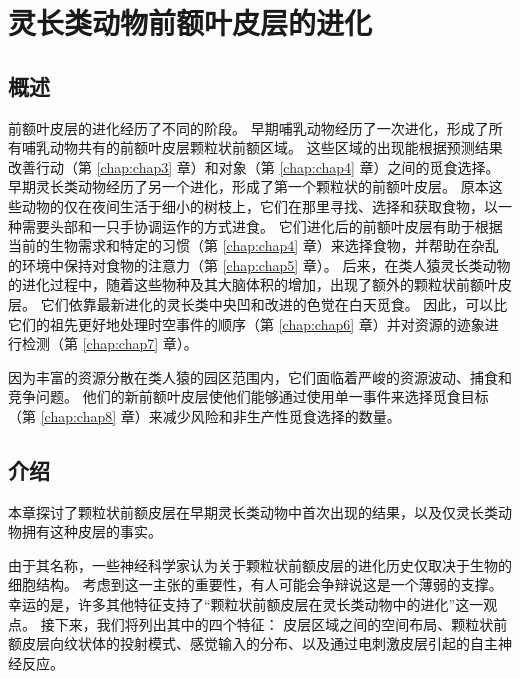 \chapter{灵长类动物前额叶皮层的进化} \label{chap:chap2}

\section{概述}
前额叶皮层的进化经历了不同的阶段。
早期哺乳动物经历了一次进化，形成了所有哺乳动物共有的前额叶皮层颗粒状前额区域。
这些区域的出现能根据预测结果改善行动（第 \ref{chap:chap3} 章）和对象（第 \ref{chap:chap4} 章）之间的觅食选择。
早期灵长类动物经历了另一个进化，形成了第一个颗粒状的前额叶皮层。
原本这些动物的仅在夜间生活于细小的树枝上，它们在那里寻找、选择和获取食物，以一种需要头部和一只手协调运作的方式进食。
它们进化后的前额叶皮层有助于根据当前的生物需求和特定的习惯（第 \ref{chap:chap4} 章）来选择食物，并帮助在杂乱的环境中保持对食物的注意力（第 \ref{chap:chap5} 章）。
后来，在类人猿灵长类动物的进化过程中，随着这些物种及其大脑体积的增加，出现了额外的颗粒状前额叶皮层。
它们依靠最新进化的灵长类中央凹和改进的色觉在白天觅食。
因此，可以比它们的祖先更好地处理时空事件的顺序（第 \ref{chap:chap6} 章）并对资源的迹象进行检测（第 \ref{chap:chap7} 章）。\begin{flushright}
\end{flushright}
因为丰富的资源分散在类人猿的园区范围内，它们面临着严峻的资源波动、捕食和竞争问题。
他们的新前额叶皮层使他们能够通过使用单一事件来选择觅食目标（第 \ref{chap:chap8} 章）来减少风险和非生产性觅食选择的数量。








\section{介绍}

本章探讨了颗粒状前额皮层在早期灵长类动物中首次出现的结果，以及仅灵长类动物拥有这种皮层的事实\cite{preuss2007evolutionary}。

由于其名称，一些神经科学家认为关于颗粒状前额皮层的进化历史仅取决于生物的细胞结构。
考虑到这一主张的重要性，有人可能会争辩说这是一个薄弱的支撑。
幸运的是，许多其他特征支持了“颗粒状前额皮层在灵长类动物中的进化”这一观点。
接下来，我们将列出其中的四个特征：
皮层区域之间的空间布局、颗粒状前额皮层向纹状体的投射模式、感觉输入的分布、以及通过电刺激皮层引起的自主神经反应。




